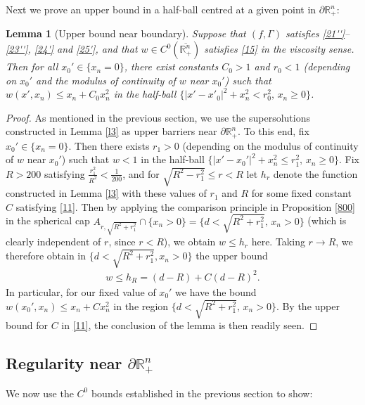 \documentclass[12pt]{article}
\numberwithin{equation}{section}
\theoremstyle{plain}
\newtheorem{lem}[thm]{Lemma}
\theoremstyle{definition}
\begin{document}
Next we prove an upper bound in a half-ball centred at a given point in $\partial\mathbb{R}_+^n$: 

\begin{lem}[Upper bound near boundary]\label{l2}
	Suppose that $(f,\Gamma)$ satisfies \eqref{21''}--\eqref{23''}, \eqref{24'} and \eqref{25'}, and that $w\in C^0(\overline{\mathbb{R}_+^n})$ satisfies \eqref{15} in the viscosity sense. Then for all $x_0' \in \{x_n=0\}$, there exist constants $C_0>1$ and $r_0<1$ (depending on $x_0'$ and the modulus of continuity of $w$ near $x_0'$) such that $w(x', x_n) \leq x_n + C_0x_n^2$ in the half-ball $\{|x'-x'_0|^2 + x_n^2 < r_0^2,\, x_n\geq 0\}$. 
\end{lem}


\begin{proof}
	As mentioned in the previous section, we use the supersolutions constructed in Lemma \ref{l3} as upper barriers near $\partial\mathbb{R}_+^n$. To this end, fix $x_0'\in\{x_n=0\}$. Then there exists $r_1>0$ (depending on the modulus of continuity of $w$ near $x_0'$) such that $w<1$ in the half-ball $\{|x'-x_0'|^2 + x_n^2 \leq r_1^2,\, x_n \geq 0\}$. Fix $R>200$ satisfying $\frac{r_1^2}{R^2}< \frac{1}{200}$, and for $\sqrt{R^2 - r_1^2} \leq r < R$ let $h_r$ denote the function constructed in Lemma \ref{l3} with these values of $r_1$ and $R$ for some fixed constant $C$ satisfying \eqref{11}. Then by applying the comparison principle in Proposition \ref{800} in the spherical cap $A_{r, \sqrt{R^2 + r_1^2}} \cap \{x_n > 0\}  = \{d<\sqrt{R^2 + r_1^2},\, x_n>0\}$ (which is clearly independent of $r$, since $r<R$), we obtain $w \leq h_{r}$ here. Taking $r \rightarrow R$, we therefore obtain in $\{d<\sqrt{R^2 + r_1^2}, x_n>0\}$ the upper bound
	\begin{align*}
	w \leq h_R =  (d-R) + C(d-R)^2. 
	\end{align*}
	In particular, for our fixed value of $x_0'$ we have the bound $w(x_0', x_n) \leq x_n + Cx_n^2$ in the region $\{d<\sqrt{R^2 + r_1^2},\, x_n>0\}$. By the upper bound for $C$ in \eqref{11}, the conclusion of the lemma is then readily seen.
\end{proof}





\subsection{Regularity near $\partial\mathbb{R}_+^n$}\label{reg}

We now use the $C^0$ bounds established in the previous section to show:
\end{document}
